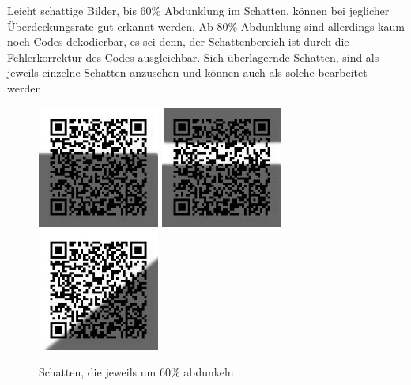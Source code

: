 Leicht schattige Bilder, bis 60\% Abdunklung im Schatten, können bei jeglicher Überdeckungsrate gut erkannt werden. Ab 80\% Abdunklung sind allerdings kaum noch Codes dekodierbar, es sei denn, der Schattenbereich ist durch die Fehlerkorrektur des Codes ausgleichbar. Sich überlagernde Schatten, sind als jeweils einzelne Schatten anzusehen und können auch als solche bearbeitet werden.
\begin{figure}[H]
  \centering
  \includegraphics[height=4cm]{img/QR/shade_03_60+60.jpg}
  \includegraphics[height=4cm]{img/QR/shade_03_2x60.jpg}
  \includegraphics[height=4cm]{img/QR/shade_03_60+s40.jpg}
  \caption{Schatten, die jeweils um 60\% abdunkeln}
  \label{fig:qrshade}
\end{figure}
